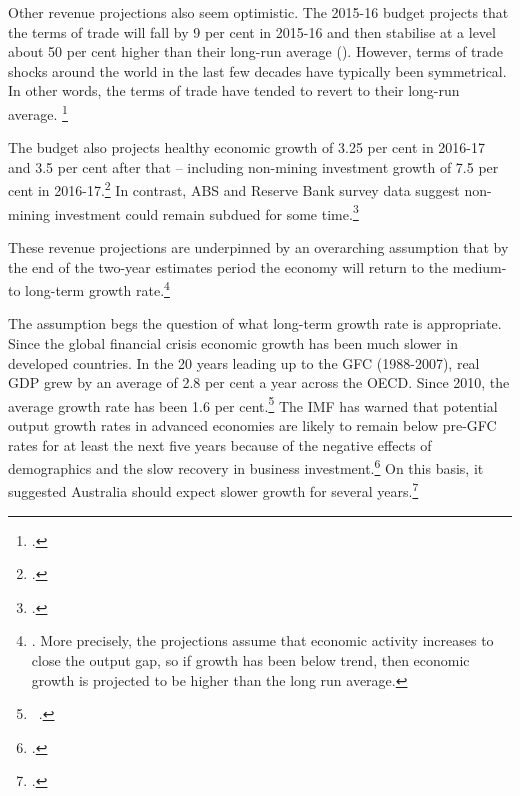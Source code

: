 \documentclass[twoside,english]{grattanBudgetRepairb5portrait}
\begin{document}
Other revenue projections also seem optimistic. The 2015-16 budget projects that the terms of trade will fall by 9 per cent in 2015-16 and then stabilise at a level about 50 per cent higher than their long-run average (). However, terms of trade shocks around the world in the last few decades have typically been symmetrical. In other words, the terms of trade have tended to revert to their long-run average. \footcite[][34--35]{MinifieCherastidthamMullerworthEtAl2013} 


The budget also projects healthy economic growth of 3.25 per cent in 2016-17 and 3.5 per cent after that – including non-mining investment growth of 7.5 per cent in 2016-17.\footcites[][1--7]{Treasury2015BudgetPapers201516}  In contrast, ABS and Reserve Bank survey data suggest non-mining investment could remain subdued for some time.\footcite[][38--44]{RBA2015a}  

These revenue projections are underpinned by an overarching assumption that by the end of the two-year estimates period the economy will return to the medium- to long-term growth rate.\footnote{\textcite{Treasury2014h}.  More precisely, the projections assume that economic activity increases to close the output gap, so if growth has been below trend, then economic growth is projected to be higher than the long run average.}

The assumption begs the question of what long-term growth rate is appropriate. Since the global financial crisis economic growth has been much slower in developed countries. In the 20 years leading up to the GFC (1988-2007), real GDP grew by an average of 2.8 per cent a year across the OECD\@. Since 2010, the average growth rate has been 1.6 per cent.\footnote{\gao\ \textcite{OECD2015a}.}  The IMF has warned that potential output growth rates in advanced economies are likely to remain below pre-GFC rates for at least the next five years because of the negative effects of demographics and the slow recovery in business investment.\footcite[][Chapter~3]{IMF2015b}  On this basis, it suggested Australia should expect slower growth for several years.\footcite{IMF2015} 
\end{document}
